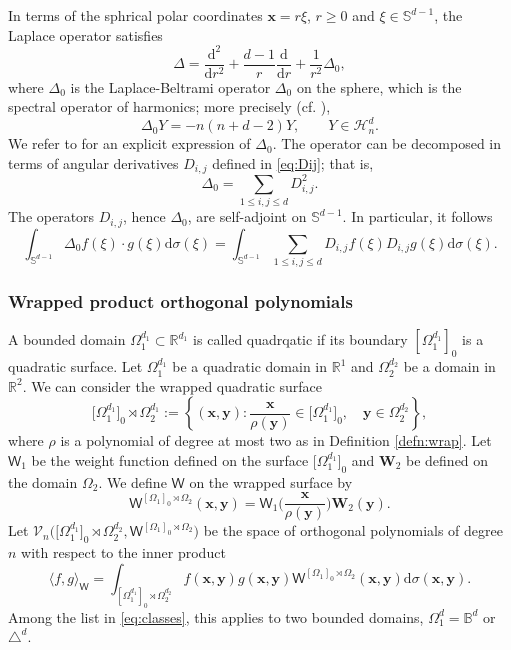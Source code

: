 \documentclass{amsart}
\theoremstyle{remark}
\def\la{{\langle}}
\def\ra{{\rangle}}
\def\d{\mathrm{d}}
\def\sph{{\mathbb{S}^{d-1}}}
\def\sW{{\mathsf W}}
\def\s{\sigma}
\def\la{{\langle}}
\def\ra{{\rangle}}
\def\xb{{\bm x}}
\def\yb{{\bm y}}
\def\Wb{{\bm W}}
\def\CH{{\mathcal H}}
\def\CV{{\mathcal V}}
\def\BB{{\mathbb B}}
\def\RR{{\mathbb R}}
\begin{document}
In terms of the sphrical polar coordinates $\bm x = r \xi$, $r \ge 0$ and $\xi \in \sph$, the Laplace operator satisfies
$$
  \Delta = \frac{\d^2}{\d r^2} + \frac{d-1}{r} \frac{\d}{\d r} + \frac{1}{r^2} \Delta_0,
$$
where $\Delta_0$ is the Laplace-Beltrami operator $\Delta_0$ on the sphere, which is the spectral operator of harmonics; more
precisely (cf. \cite[(1.4.9)]{DaiX}), 
\begin{equation} \label{eq:sph-harmonics}
     \Delta_0 Y = -n(n+d-2) Y, \qquad Y \in \CH_n^d. 
\end{equation}
We refer to \cite[Section 1.4]{DaiX} for an explicit expression of $\Delta_0$. The operator can be decomposed in terms of 
angular derivatives $D_{i,j}$ defined in \eqref{eq:Dij}; that is, 
\begin{equation} \label{eq:Delta0=}
   \Delta_0 = \sum_{1 \le i,j \le d} D_{i,j}^2. 
\end{equation}
The operators $D_{i,j}$, hence $\Delta_0$, are self-adjoint on $\sph$. In particular, it follows 
\begin{equation} \label{eq:Dij-integral}
  \int_{\sph} \Delta_0 f(\xi)\cdot g(\xi) \d \sigma(\xi) =  \int_{\sph} \sum_{1 \le i,j \le d} D_{i,j} f(\xi) D_{i,j} g(\xi) \d \sigma(\xi). 
\end{equation}

\subsubsection{Wrapped product orthogonal polynomials}
A bounded domain $\Omega_1^{d_1} \subset \RR^{d_1}$ is called quadrqatic if its boundary $[\Omega_1^{d_1}]_0$ is 
a quadratic surface. Let $\Omega_1^{d_1}$ be a quadratic domain in $\RR^1$ and $\Omega_2^{d_2}$ be a domain 
in $\RR^2$. We can consider the wrapped quadratic surface  
$$
  \big[\Omega_1^{d_1}\big]_0 \rtimes \Omega_2^{d_1} := \left\{(\xb,\yb): 
      \frac{\xb}{\rho(\yb)} \in\big [\Omega_1^{d_1}\big]_0, \quad \yb \in \Omega_2^{d_2}\right\},
$$
where $\rho$ is a polynomial of degree at most two as in Definition \ref{defn:wrap}. Let $\sW_1$ be the weight 
function defined on the surface $\big[\Omega_1^{d_1}\big]_0$ and $\Wb_2$ be defined on the domain $\Omega_2$. 
We define $\sW$ on the wrapped surface by
$$
  \sW^{[\Omega_1]_0 \rtimes \Omega_2}(\xb,\yb)= \sW_1\bigg(\frac{\xb}{ \rho(\yb)} \bigg)\Wb_2(\yb). 
$$
Let $\CV_n \big(\big[\Omega_1^{d_1}\big]_0 \rtimes \Omega_2^{d_2}, \sW^{[\Omega_1]_0 \rtimes \Omega_2} \big)$ 
be the space of orthogonal polynomials of degree $n$ with respect to the inner product 
$$
  \la f, g\ra_\sW = \int_{[\Omega_1^{d_1}]_0 \rtimes \Omega_2^{d_2}} f(\xb,\yb) g(\xb,\yb) 
      \sW^{[\Omega_1]_0 \rtimes \Omega_2}(\xb,\yb) \d \s (\xb,\yb).
$$
Among the list in \eqref{eq:classes}, this applies to two bounded domains, $\Omega_1^{d} = \BB^d$ or $\triangle^d$.
\end{document}
